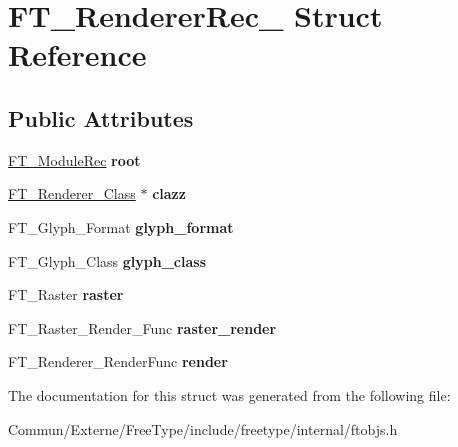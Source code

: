 \hypertarget{struct_f_t___renderer_rec__}{}\section{F\+T\+\_\+\+Renderer\+Rec\+\_\+ Struct Reference}
\label{struct_f_t___renderer_rec__}
\subsection*{Public Attributes}
\begin{DoxyCompactItemize}
\item 
\hyperlink{struct_f_t___module_rec__}{F\+T\+\_\+\+Module\+Rec} {\bfseries root}\hypertarget{struct_f_t___renderer_rec___a7c93326898f03a9eb224f57104fa2433}{}\label{struct_f_t___renderer_rec___a7c93326898f03a9eb224f57104fa2433}

\item 
\hyperlink{struct_f_t___renderer___class__}{F\+T\+\_\+\+Renderer\+\_\+\+Class} $\ast$ {\bfseries clazz}\hypertarget{struct_f_t___renderer_rec___a2b13c0a776ea7f589f41f576f9c4e8ad}{}\label{struct_f_t___renderer_rec___a2b13c0a776ea7f589f41f576f9c4e8ad}

\item 
F\+T\+\_\+\+Glyph\+\_\+\+Format {\bfseries glyph\+\_\+format}\hypertarget{struct_f_t___renderer_rec___a478b14f577b633cea7043fb17d404721}{}\label{struct_f_t___renderer_rec___a478b14f577b633cea7043fb17d404721}

\item 
F\+T\+\_\+\+Glyph\+\_\+\+Class {\bfseries glyph\+\_\+class}\hypertarget{struct_f_t___renderer_rec___a38a591be1d20fb2b4d81e48ebb624dd7}{}\label{struct_f_t___renderer_rec___a38a591be1d20fb2b4d81e48ebb624dd7}

\item 
F\+T\+\_\+\+Raster {\bfseries raster}\hypertarget{struct_f_t___renderer_rec___a9c54a2da84f5892e0563d032ebd1ee09}{}\label{struct_f_t___renderer_rec___a9c54a2da84f5892e0563d032ebd1ee09}

\item 
F\+T\+\_\+\+Raster\+\_\+\+Render\+\_\+\+Func {\bfseries raster\+\_\+render}\hypertarget{struct_f_t___renderer_rec___a6dc07268fc39d9dde130a5708607d19d}{}\label{struct_f_t___renderer_rec___a6dc07268fc39d9dde130a5708607d19d}

\item 
F\+T\+\_\+\+Renderer\+\_\+\+Render\+Func {\bfseries render}\hypertarget{struct_f_t___renderer_rec___a197bfeb9dde4aef8eee87bc3ea95312e}{}\label{struct_f_t___renderer_rec___a197bfeb9dde4aef8eee87bc3ea95312e}

\end{DoxyCompactItemize}


The documentation for this struct was generated from the following file\+:\begin{DoxyCompactItemize}
\item 
Commun/\+Externe/\+Free\+Type/include/freetype/internal/ftobjs.\+h\end{DoxyCompactItemize}
